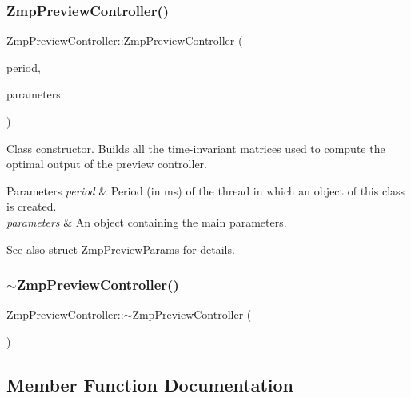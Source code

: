 \subsubsection{\texorpdfstring{Zmp\+Preview\+Controller()}{ZmpPreviewController()}}
{\footnotesize\ttfamily Zmp\+Preview\+Controller\+::\+Zmp\+Preview\+Controller (\begin{DoxyParamCaption}\item[{const double}]{period,  }\item[{std\+::shared\+\_\+ptr$<$ \hyperlink{structZmpPreviewParams}{Zmp\+Preview\+Params} $>$}]{parameters }\end{DoxyParamCaption})}

Class constructor. Builds all the time-\/invariant matrices used to compute the optimal output of the preview controller. 
\begin{DoxyParams}{Parameters}
{\em period} & Period (in ms) of the thread in which an object of this class is created. \\
\hline
{\em parameters} & An object containing the main parameters. \\
\hline
\end{DoxyParams}
\begin{DoxySeeAlso}{See also}
struct \hyperlink{structZmpPreviewParams}{Zmp\+Preview\+Params} for details. 
\end{DoxySeeAlso}
\hypertarget{classZmpPreviewController_af702c45f318c7a78310d19cc061886dd}{}\label{classZmpPreviewController_af702c45f318c7a78310d19cc061886dd} 
\subsubsection{\texorpdfstring{$\sim$\+Zmp\+Preview\+Controller()}{~ZmpPreviewController()}}
{\footnotesize\ttfamily Zmp\+Preview\+Controller\+::$\sim$\+Zmp\+Preview\+Controller (\begin{DoxyParamCaption}{ }\end{DoxyParamCaption})\hspace{0.3cm}{\ttfamily [virtual]}}



\subsection{Member Function Documentation}
\hypertarget{classZmpPreviewController_a39ffdba07960f90a6cce247065f12504}{}\label{classZmpPreviewController_a39ffdba07960f90a6cce247065f12504} 
